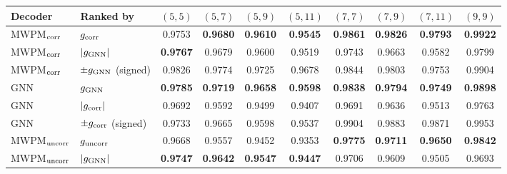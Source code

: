 \begin{tabular}{ll|cccccccc}
\toprule
Decoder & Ranked by & $(5, 5)$ & $(5, 7)$ & $(5, 9)$ & $(5, 11)$ & $(7, 7)$ & $(7, 9)$ & $(7, 11)$ & $(9, 9)$ \\
\hline
\midrule
MWPM$_{\rm corr}$ & $g_{\rm corr}$ & 0.9753 & \textbf{0.9680} & \textbf{0.9610} & \textbf{0.9545} & \textbf{0.9861} & \textbf{0.9826} & \textbf{0.9793} & \textbf{0.9922} \\
MWPM$_{\rm corr}$ & $|g_{\rm GNN}|$ & \textbf{0.9767} & 0.9679 & 0.9600 & 0.9519 & 0.9743 & 0.9663 & 0.9582 & 0.9799 \\
MWPM$_{\rm corr}$ & $\pm g_{\rm GNN}$ (signed) & 0.9826 & 0.9774 & 0.9725 & 0.9678 & 0.9844 & 0.9803 & 0.9753 & 0.9904 \\
\hline
GNN & $g_{\rm GNN}$ & \textbf{0.9785} & \textbf{0.9719} & \textbf{0.9658} & \textbf{0.9598} & \textbf{0.9838} & \textbf{0.9794} & \textbf{0.9749} & \textbf{0.9898} \\
GNN & $|g_{\rm corr}|$ & 0.9692 & 0.9592 & 0.9499 & 0.9407 & 0.9691 & 0.9636 & 0.9513 & 0.9763 \\
GNN & $\pm g_{\rm corr}$ (signed) & 0.9733 & 0.9665 & 0.9598 & 0.9537 & 0.9904 & 0.9883 & 0.9871 & 0.9953 \\
\hline
MWPM$_{\rm uncorr}$ & $g_{\rm uncorr}$ & 0.9668 & 0.9557 & 0.9452 & 0.9353 & \textbf{0.9775} & \textbf{0.9711} & \textbf{0.9650} & \textbf{0.9842} \\
MWPM$_{\rm uncorr}$ & $|g_{\rm GNN}|$ & \textbf{0.9747} & \textbf{0.9642} & \textbf{0.9547} & \textbf{0.9447} & 0.9706 & 0.9609 & 0.9505 & 0.9693 \\
\bottomrule
\end{tabular}
